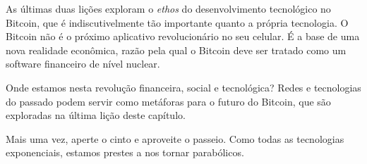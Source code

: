 As últimas duas lições exploram o \textit{ethos} do desenvolvimento tecnológico no Bitcoin, que é indiscutivelmente tão importante quanto a própria tecnologia. O Bitcoin não é o próximo aplicativo revolucionário no seu celular. É a base de uma nova realidade econômica, razão pela qual o Bitcoin deve ser tratado como um software financeiro de nível nuclear.

Onde estamos nesta revolução financeira, social e tecnológica? Redes e tecnologias do passado podem servir como metáforas para o futuro do Bitcoin, que são exploradas na última lição deste capítulo.

Mais uma vez, aperte o cinto e aproveite o passeio. Como todas as tecnologias exponenciais, estamos prestes a nos tornar parabólicos.